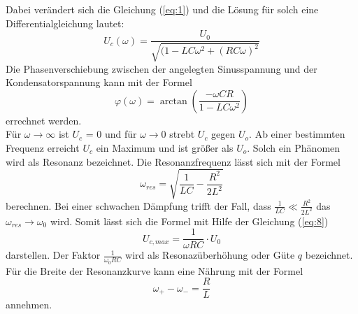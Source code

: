 Dabei verändert sich die Gleichung (\ref{eq:1}) und die Lösung für solch eine Differentialgleichung lautet:
\begin{equation}
  U_c(\omega) = \frac{U_0}{\sqrt{(1-LC\omega^2 + (RC\omega)^2}}
  \label{eq:6}
\end{equation}
Die Phasenverschiebung zwischen der angelegten Sinusspannung und der Kondensatorspannung kann mit der Formel
\begin{equation}
\varphi(\omega) = \arctan(\frac{-\omega CR}{1-LC\omega^2})
\label{eq:7}
\end{equation}
errechnet werden.\\
Für $\omega \rightarrow \infty$ ist $U_c$ = 0 und für $\omega \rightarrow 0$ strebt $U_c$ gegen $U_o$.
Ab einer bestimmten Frequenz erreicht $U_c$ ein Maximum und ist größer als $U_o$.
Solch ein Phänomen wird als Resonanz bezeichnet.
Die Resonanzfrequenz lässt sich mit der Formel
\begin{equation}
  \omega_{res} = \sqrt{\frac{1}{LC} - \frac{R^2}{2L^2}}
  \label{eq:8}
\end{equation}
berechnen.
Bei einer schwachen Dämpfung trifft der Fall, dass $\frac{1}{LC} \ll \frac{R^2}{2L^2}$ das $\omega_{res} \rightarrow \omega_0$ wird.
Somit lässt sich die Formel mit Hilfe der Gleichung (\ref{eq:8})
\begin{equation}
  U_{c,max} = \frac{1}{\omega RC} \cdot U_0
  \label{eq:9}
\end{equation}
darstellen. Der Faktor $\frac{1}{\omega_0 RC}$ wird als Resonazüberhöhung oder Güte $q$ bezeichnet.
Für die Breite der Resonanzkurve kann eine Nährung mit der Formel
\begin{equation}
  \omega_+ - \omega_- = \frac{R}{L}
  \label{eq:10}
\end{equation}
annehmen.
